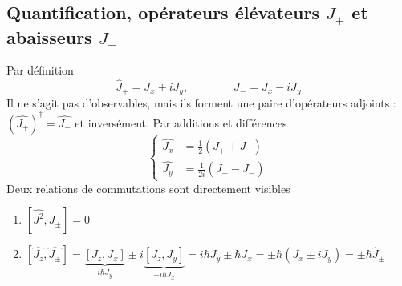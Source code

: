 	\subsection{Quantification, opérateurs élévateurs $J_+$ et abaisseurs $J_-$}
	Par définition
	\begin{equation}
	\hat{J}_+ = J_x + iJ_y,\qquad\qquad
	\hat{J}_- = J_x - iJ_y	
	\end{equation}
	Il ne s'agit pas d'observables, mais ils forment une paire d'opérateurs adjoints : $(\hat{J_+})^\dagger = \hat{J_-}$
	et inversément. Par additions et différences
	\begin{equation}
	\left\{\begin{array}{ll}
	\hat{J_x} &= \frac{1}{2}\left(J_++J_-\right)\\
	\hat{J_y} &= \frac{1}{2i}\left(J_+-J_-\right)	
	\end{array}\right.
	\end{equation}
	Deux relations de commutations sont directement visibles
	\begin{enumerate}
	\item $[\hat{J^2},J_\pm] = 0$
	\item $[\hat{J_z},\hat{J_\pm}] = \underbrace{[J_z,J_x]}_{i\hbar J_y}\pm i\underbrace{[J_z,J_y]}_{
	-i\hbar J_x} = i\hbar J_y\pm\hbar J_x = \pm \hbar(J_x\pm iJ_y) = \pm \hbar  \hat{J}_\pm$
	\end{enumerate}

